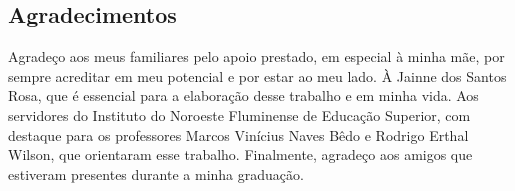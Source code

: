\newpage
\blankpage

\begin{center}
  \section*{Agradecimentos}
\end{center}

Agradeço aos meus familiares pelo apoio prestado, em especial à minha mãe, por sempre acreditar em meu potencial e por estar ao meu lado.
À Jainne dos Santos Rosa, que é essencial para a elaboração desse trabalho e em minha vida.
Aos servidores do Instituto do Noroeste Fluminense de Educação Superior, com destaque para os professores Marcos Vinícius Naves Bêdo e Rodrigo Erthal Wilson, que orientaram esse trabalho.
Finalmente, agradeço aos amigos que estiveram presentes durante a minha graduação.
